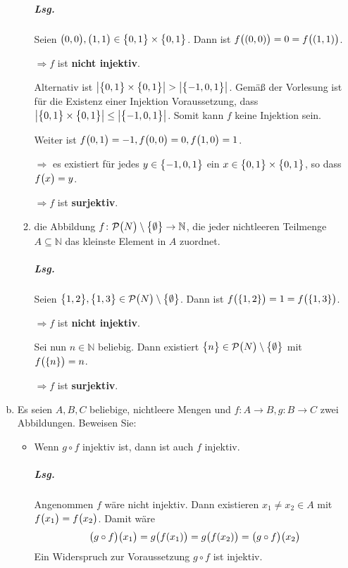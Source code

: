 \documentclass{scrreprt}
\begin{document}
\begin{enumerate}[(a)]
\begin{enumerate}[(1)]
    \subparagraph{Lsg.} Seien $\qty\big(0, 0), \qty\big(1, 1) \in \qty\big{0, 1} \times \qty\big{0, 1}$.
    Dann ist $f\qty\big((0, 0)) = 0 = f\qty\big((1, 1))$.

    $\Rightarrow f$ ist \textbf{nicht injektiv}.

    Alternativ ist
    $\abs{\qty\big{0, 1} \times \qty\big{0, 1}} > \abs{\qty\big{-1, 0, 1}}$.
    Gemäß der Vorlesung ist für die Existenz einer Injektion Voraussetzung, dass
    $\abs{\qty\big{0, 1} \times \qty\big{0, 1}} \leq \abs{\qty\big{-1, 0, 1}}$.
    Somit kann $f$ keine Injektion sein.

    Weiter ist  $f\qty\big(0, 1) = -1, f\qty\big(0, 0) = 0, f\qty\big(1, 0) = 1$.

    $\Rightarrow$ es existiert für jedes $y \in \qty\big{-1, 0, 1}$ ein
    $x \in \qty\big{0, 1} \times \qty\big{0, 1}$, so dass $f\qty\big(x) = y$.

    $\Rightarrow f$ ist \textbf{surjektiv}.

  \item die Abbildung
    $f \colon \mathcal{P}\qty\big(N) \setminus \qty\big{\emptyset} \to \mathbb{N}$,
    die jeder nichtleeren Teilmenge $A \subseteq \mathbb{N}$ das kleinste
    Element in $A$ zuordnet.

    \subparagraph{Lsg.} Seien $\qty\big{1, 2}, \qty\big{1, 3} \in \mathcal{P}\qty\big(N) \setminus \qty\big{\emptyset}$.
    Dann ist $f\qty\big(\qty{1, 2}) = 1 = f\qty\big(\qty{1, 3})$.

    $\Rightarrow f$ ist \textbf{nicht injektiv}.

    Sei nun $n \in \mathbb{N}$ beliebig.
    Dann existiert
    $\qty\big{n} \in \mathcal{P}\qty\big(N) \setminus \qty\big{\emptyset}$
    mit $f\qty\big(\qty{n}) = n$.

    $\Rightarrow f$ ist \textbf{surjektiv}.

  \end{enumerate}
\item Es seien $A, B, C$ beliebige, nichtleere Mengen und
  $f \colon A \to B, g \colon B \to C$ zwei Abbildungen.
  Beweisen Sie:
  \begin{itemize}
  \item Wenn $g \circ f$ injektiv ist, dann ist auch $f$ injektiv.

    \subparagraph{Lsg.} Angenommen $f$ wäre nicht injektiv.
    Dann existieren $x_1 \ne x_2 \in A$ mit
    $f\qty\big(x_1) = f\qty\big(x_2)$.
    Damit wäre
    \[
      \qty\big(g \circ f)\qty\big(x_1) =
      g\qty\big(f(x_1)) =
      g\qty\big(f(x_2)) =
      \qty\big(g \circ f)\qty\big(x_2)
    \]
    Ein Widerspruch zur Voraussetzung $g \circ f$ ist injektiv.


\end{itemize}
\end{enumerate}
\end{document}
